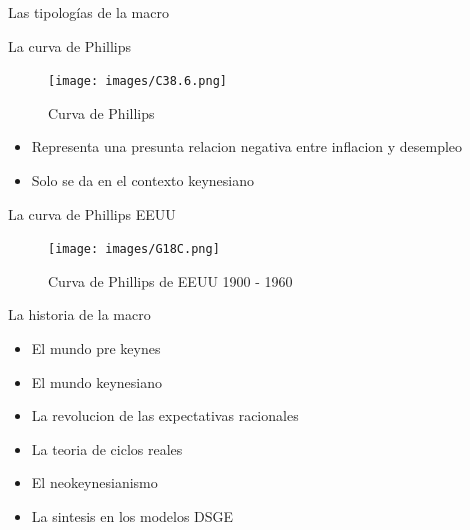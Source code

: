 \documentclass{beamer}
\begin{document}


\begin{frame}{Las tipologías de la macro}
\begin{table}[]
\end{table}

\end{frame}



\begin{frame}{La curva de Phillips}
    \begin{figure} [H]   
  \centering
  \texttt{[image: images/C38.6.png]}
  \caption{Curva de Phillips}
  \label{fig:C38.6}
\end{figure}
\begin{itemize}
    \item Representa una presunta relacion negativa entre inflacion y desempleo
    \item Solo se da en el contexto keynesiano
\end{itemize}
\end{frame} 


\begin{frame}{La curva de Phillips EEUU}
    
\begin{figure} [H]   
  \centering
  \texttt{[image: images/G18C.png]}
  \caption{Curva de Phillips de EEUU 1900 - 1960}
  \label{fig:C38.7}
\end{figure}

\end{frame}



\begin{frame}{La historia de la macro}
    \begin{itemize}
        \item El mundo pre keynes
        \item El mundo keynesiano
        \item La revolucion de las expectativas racionales
        \item La teoria de ciclos reales
        \item El neokeynesianismo
        \item La sintesis en los modelos DSGE
    \end{itemize}
\end{frame}
\end{document}
